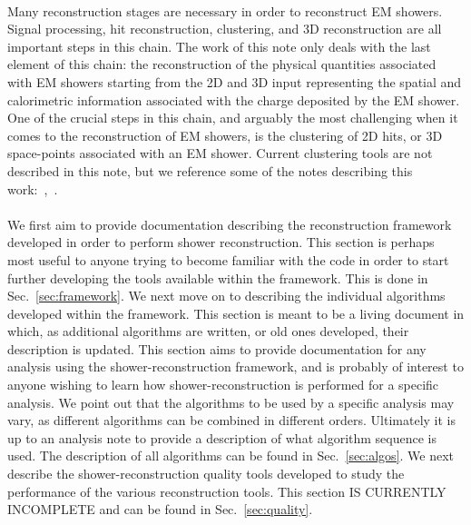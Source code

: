 \paragraph{}Many reconstruction stages are necessary in order to reconstruct EM showers. Signal processing, hit reconstruction, clustering, and 3D reconstruction are all important steps in this chain. The work of this note only deals with the last element of this chain: the reconstruction of the physical quantities associated with EM showers starting from the 2D and 3D input representing the spatial and calorimetric information associated with the charge deposited by the EM shower. One of the crucial steps in this chain, and arguably the most challenging when it comes to the reconstruction of EM showers, is the clustering of 2D hits, or 3D space-points associated with an EM shower. Current clustering tools are not described in this note, but we reference some of the notes describing this work:~\cite{bib:pandora},~\cite{bib:LArOpenCV}.
\paragraph{}We first aim to provide documentation describing the reconstruction framework developed in order to perform shower reconstruction. This section is perhaps most useful to anyone trying to become familiar with the code in order to start further developing the tools available within the framework. This is done in Sec.~\ref{sec:framework}. We next move on to describing the individual algorithms developed within the framework. This section is meant to be a living document in which, as additional algorithms are written, or old ones developed, their description is updated. This section aims to provide documentation for any analysis using the shower-reconstruction framework, and is probably of interest to anyone wishing to learn how shower-reconstruction is performed for a specific analysis. We point out that the algorithms to be used by a specific analysis may vary, as different algorithms can be combined in different orders. Ultimately it is up to an analysis note to provide a description of what algorithm sequence is used. The description of all algorithms can be found in Sec.~\ref{sec:algos}. We next describe the shower-reconstruction quality tools developed to study the performance of the various reconstruction tools. This section {\color{red} IS CURRENTLY INCOMPLETE} and can be found in Sec.~\ref{sec:quality}.
